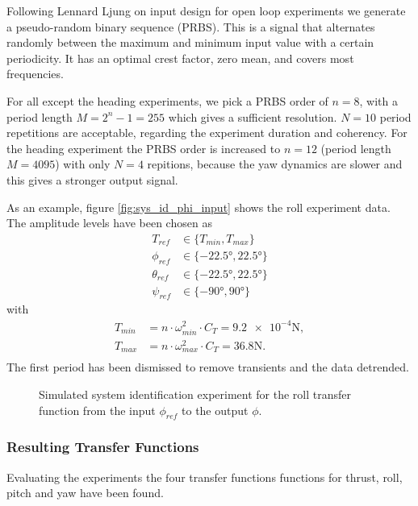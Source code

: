 Following Lennard Ljung on input design for open loop experiments \cite{ljung1999system} we generate a pseudo-random binary sequence (PRBS). This is a signal that alternates randomly between the maximum and minimum input value with a certain periodicity. It has an optimal crest factor, zero mean, and covers most frequencies. 

For all except the heading experiments, we pick a PRBS order of $n=8$, with a period length $M = 2^n-1 = 255$ which gives a sufficient resolution. $N = 10$ period repetitions are acceptable, regarding the experiment duration and coherency. For the heading experiment the PRBS order is increased to $n=12$ (period length $M=4095$) with only $N =4$ repitions, because the yaw dynamics are slower and this gives a stronger output signal.

As an example, figure \ref{fig:sys_id_phi_input} shows the roll experiment data. The amplitude levels have been chosen as
\begin{align}
T_{ref} &\in \{T_{min},T_{max}\} \\
\phi_{ref} &\in \{-22.5\si{\degree},22.5\si{\degree}\} \\
\theta_{ref} &\in \{-22.5\si{\degree},22.5\si{\degree}\} \\
\psi_{ref} &\in \{-90\si{\degree},90\si{\degree}\}
\end{align}
with
\begin{align}
T_{min} &= n \cdot \omega_{min}^2 \cdot C_T =  \num{9.2e-4} \si{\newton} , \label{eq:T_min}\\
T_{max} &= n \cdot \omega_{max}^2 \cdot C_T =  \num{36.8}\si{\newton} .\label{eq:T_max}\\
\end{align}
The first period has been dismissed to remove transients and the data detrended.

\begin{figure}
\centering
{}
\qquad
{}
\caption[Simulated system identification experiment]{Simulated system identification experiment for the roll transfer function from the input $\phi_{ref}$ to the output $\phi$.}
\label{fig:sys_id_phi}
\end{figure}

\subsubsection{Resulting Transfer Functions}
Evaluating the experiments the four transfer functions functions for thrust, roll, pitch and yaw have been found.

